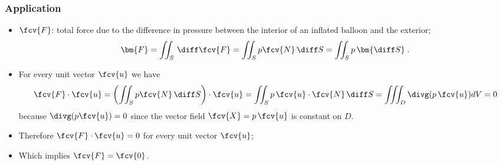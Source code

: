 \begin{frame}
  \frametitle{Application}

\begin{itemize}
  \item \pause $\fcv{F}$: total force due to the difference in pressure between the interior of an inflated balloon and the exterior;
%
$$\bm{F} =  \iint_S \, \diff \fcv{F} = \iint_S p \fcv{N} \, \diff S = \iint_S p\, \bm{\diff S} \; .$$
%
\item \pause For every unit vector $\fcv{u}$ we have
%
\begin{align*}
  \fcv{F} \cdot \fcv{u} = \left(\iint_S p \fcv{N} \, \diff S \right) \cdot \fcv{u} = \iint_S p\, \fcv{u} \cdot  \fcv{N} \, \diff S = \iint\!\!\!\int_D \divg (p\, \fcv{u}) dV = 0
\end{align*}
%
because $\divg (p \fcv{u}) = 0$ since the vector field $\fcv{X}= p\, \fcv{u}$ is constant on $D$.
\item Therefore $\fcv{F}\cdot \fcv{u} = 0$ for every unit vector $\fcv{u}$;
    \item \pause Which implies $\fcv{F}=\fcv{0}$.
\end{itemize}

\end{frame}